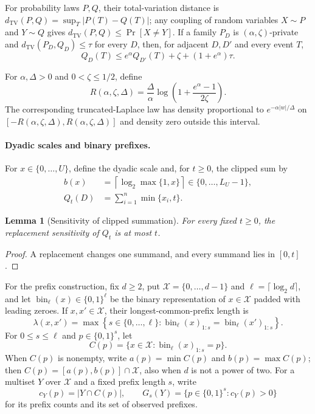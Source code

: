 \documentclass[11pt]{article}
\newtheorem{lemma}{Lemma}[section]
\begin{document}
For probability laws $P,Q$, their total-variation distance is
$d_{\mathrm{TV}}(P,Q)=\sup_T|P(T)-Q(T)|$; any coupling of random variables
$X\sim P$ and $Y\sim Q$ gives
$d_{\mathrm{TV}}(P,Q)\le\Pr[X\ne Y]$.  If a family $P_D$ is
$(\alpha,\zeta)$-private and
$d_{\mathrm{TV}}(P_D,Q_D)\le\tau$ for every $D$, then, for adjacent
$D,D'$ and every event $T$,
\begin{equation}
 Q_D(T)\le e^\alpha Q_{D'}(T)
       +\zeta+(1+e^\alpha)\tau.
 \label{eq:tv-dp}
\end{equation}

For $\alpha,\Delta>0$ and $0<\zeta\le1/2$, define
\[
 R(\alpha,\zeta,\Delta)
 =\frac{\Delta}{\alpha}
   \log\left(1+\frac{e^\alpha-1}{2\zeta}\right).
\]
The corresponding truncated-Laplace law has density proportional to
$e^{-\alpha|w|/\Delta}$ on
$[-R(\alpha,\zeta,\Delta),\allowbreak R(\alpha,\zeta,\Delta)]$ and density zero
outside this interval.

\paragraph{Dyadic scales and binary prefixes.}
For $x\in\{0,\ldots,U\}$, define the dyadic scale and, for $t\ge0$, the
clipped sum by
\begin{align}
 b(x)&=\left\lceil\log_2\max\{1,x\}\right\rceil
       \in\{0,\ldots,L_U-1\},
 \label{eq:dyadic-scale}\\
 Q_t(D)&=\sum_{i=1}^n\min\{x_i,t\}.
 \label{eq:clipped-sum}
\end{align}

\begin{lemma}[Sensitivity of clipped summation]
\label{lem:clipped-sensitivity}
For every fixed $t\ge0$, the replacement sensitivity of $Q_t$ is at most
$t$.
\end{lemma}

\begin{proof}
A replacement changes one summand, and every summand lies in $[0,t]$.
\end{proof}

For the prefix construction, fix $d\ge2$, put
$\mathcal X=\{0,\ldots,d-1\}$ and $\ell=\lceil\log_2d\rceil$, and let
$\operatorname{bin}_{\ell}(x)\in\{0,1\}^{\ell}$ be the binary
representation of $x\in\mathcal X$ padded with leading zeroes.  If
$x,x'\in\mathcal X$, their longest-common-prefix length is
\[
 \lambda(x,x')=
 \max\left\{s\in\{0,\ldots,\ell\}:
  \operatorname{bin}_{\ell}(x)_{1:s}
  =\operatorname{bin}_{\ell}(x')_{1:s}\right\}.
\]
For $0\le s\le\ell$ and $p\in\{0,1\}^s$, let
\[
 C(p)=\{x\in\mathcal X:
       \operatorname{bin}_{\ell}(x)_{1:s}=p\}.
\]
When $C(p)$ is nonempty, write $a(p)=\min C(p)$ and $b(p)=\max C(p)$;
then $C(p)=[a(p),b(p)]\cap\mathcal X$, also when $d$ is not a power of
two.  For a multiset $Y$ over $\mathcal X$ and a fixed prefix length $s$,
write
\[
 c_Y(p)=|Y\cap C(p)|,
 \qquad
 G_s(Y)=\{p\in\{0,1\}^s:c_Y(p)>0\}
\]
for its prefix counts and its set of observed prefixes.
\end{document}

